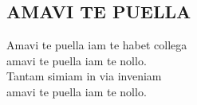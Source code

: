 \begin{flushleft}
	\section*{\Huge AMAVI TE PUELLA}
\end{flushleft}

Amavi te puella iam te habet collega\\
amavi te puella iam te nollo.\\
Tantam simiam in via inveniam\\
amavi te puella iam te nollo.

\newpage